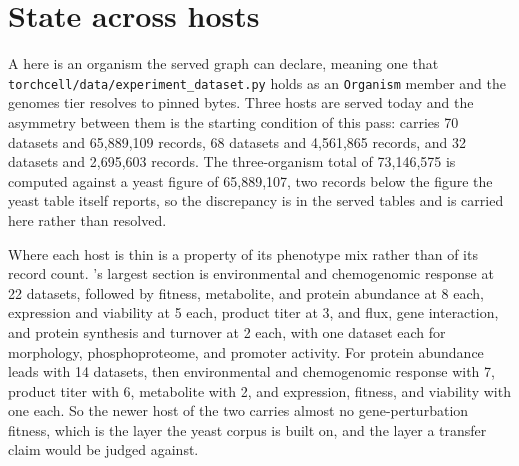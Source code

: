 
\section{State across hosts}\label{sec:state}

A  here is an organism the served graph can declare, meaning one that
\texttt{torchcell/data/experiment\_dataset.py} holds as an \texttt{Organism} member and the
genomes tier resolves to pinned bytes. Three hosts are served today and the asymmetry between
them is the starting condition of this pass:  carries 70 datasets and
65,889,109 records,  68 datasets and 4,561,865 records, and  32
datasets and 2,695,603 records. The three-organism total of 73,146,575 is computed against a
yeast figure of 65,889,107, two records below the figure the yeast table itself reports, so
the discrepancy is in the served tables and is carried here rather than resolved.

Where each host is thin is a property of its phenotype mix rather than of its record count.
's largest section is environmental and chemogenomic response at 22 datasets,
followed by fitness, metabolite, and protein abundance at 8 each, expression and viability at
5 each, product titer at 3, and flux, gene interaction, and protein synthesis and turnover at
2 each, with one dataset each for morphology, phosphoproteome, and promoter activity. For
 protein abundance leads with 14 datasets, then environmental and chemogenomic
response with 7, product titer with 6, metabolite with 2, and expression, fitness, and
viability with one each. So the newer host of the two carries almost no gene-perturbation
fitness, which is the layer the yeast corpus is built on, and the layer a transfer claim would
be judged against.

